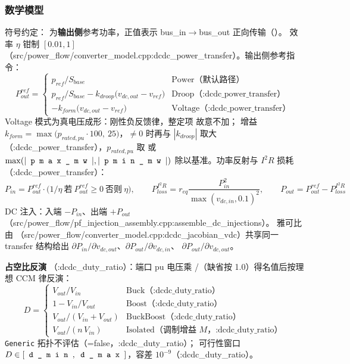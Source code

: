 \subsubsection*{数学模型}
符号约定： 为\textbf{输出侧}参考功率，正值表示 bus\_in$\to$bus\_out
正向传输（）。
效率 $\eta$ 钳制 $[0.01,1]$（src/power\_flow/converter\_model.cpp:dcdc\_power\_transfer）。输出侧参考指令：
\[
P_{out}^{ref}=\begin{cases}
p_{ref}/S_{base} & \text{Power（默认路径）}\\
p_{ref}/S_{base}-k_{droop}\big(v_{dc,out}-v_{ref}\big) & \text{Droop（:dcdc\_power\_transfer）}\\
-k_{form}\big(v_{dc,out}-v_{ref}\big) & \text{Voltage（:dcdc\_power\_transfer）}
\end{cases}
\]
Voltage 模式为真电压成形：刚性负反馈律，整定项  故意不加；
增益 $k_{form}=\max\big(p_{rated,pu}\cdot 100,\ 25\big)$，$\neq0$ 时再与
$|k_{droop}|$ 取大（:dcdc\_power\_transfer），$p_{rated,pu}$ 取  或
$\max(|\fld{pmax\_mw}|,|\fld{pmin\_mw}|)$ 除以基准。功率反射与 $I^2R$ 损耗（:dcdc\_power\_transfer）：
\[
P_{in}=P_{out}^{ref}\cdot\big(1/\eta\ \text{若}\ P_{out}^{ref}\ge 0\ \text{否则}\ \eta\big),\qquad
P_{loss}^{I^2R}=r_{eq}\frac{P_{in}^{2}}{\max(v_{dc,in},0.1)^{2}},\qquad
P_{out}=P_{out}^{ref}-P_{loss}^{I^2R}
\]
DC 注入：入端 $-P_{in}$、出端 $+P_{out}$（src/power\_flow/pf\_injection\_assembly.cpp:assemble\_dc\_injections）。
雅可比由 （src/power\_flow/converter\_model.cpp:dcdc\_jacobian\_vdc）共享同一
transfer 结构给出 $\partial P_{in}/\partial v_{dc,out}$、$\partial P_{out}/\partial v_{dc,in}$、
$\partial P_{out}/\partial v_{dc,out}$。

\textbf{占空比反演} （:dcdc\_duty\_ratio）：端口 pu 电压乘
/（缺省按 1.0）得名值后按理想 CCM 律反演：
\[
D=\begin{cases}
V_{out}/V_{in} & \text{Buck（:dcdc\_duty\_ratio）}\\
1-V_{in}/V_{out} & \text{Boost（:dcdc\_duty\_ratio）}\\
V_{out}/(V_{in}+V_{out}) & \text{BuckBoost（:dcdc\_duty\_ratio）}\\
V_{out}/(n\,V_{in}) & \text{Isolated（调制增益 }M\text{，:dcdc\_duty\_ratio）}
\end{cases}
\]
\texttt{Generic} 拓扑不评估（=false，:dcdc\_duty\_ratio）；
可行性窗口 $D\in[\fld{d\_min},\fld{d\_max}]$，容差 $10^{-9}$（:dcdc\_duty\_ratio）。

